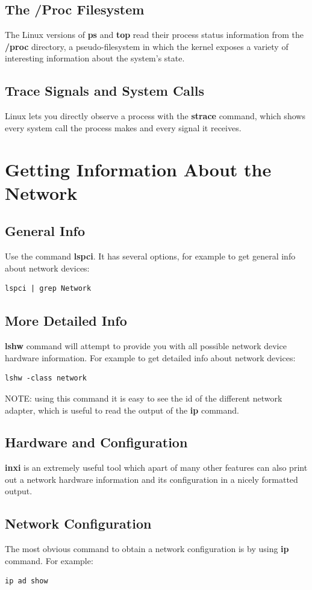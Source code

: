 \documentclass[10pt,letterpaper]{book}
\begin{document}
\subsection{The /Proc Filesystem}
The Linux versions of \textbf{ps} and \textbf{top} read their process status information from the \textbf{/proc} directory, a pseudo-filesystem in which the kernel exposes a variety of interesting information about the system's state.
\subsection{Trace Signals and System Calls}
Linux lets you directly observe a process with the \textbf{strace} command, which shows every system call the process makes and every signal it receives.

\section{Getting Information About the Network}
\subsection{General Info}
Use the command \textbf{lspci}. It has several options, for example to get general info about network devices:
\begin{lstlisting}
lspci | grep Network
\end{lstlisting}
\subsection{More Detailed Info}
\textbf{lshw} command will attempt to provide you with all possible network device hardware information. For example to get detailed info about network devices:
\begin{lstlisting}
lshw -class network
\end{lstlisting}
NOTE: using this command it is easy to see the id of the different network adapter, which is useful to read the output of the \textbf{ip} command.
\subsection{Hardware and Configuration}
\textbf{inxi} is an extremely useful tool which apart of many other features can also print out a network hardware information and its configuration in a nicely formatted output.
\subsection{Network Configuration}
The most obvious command to obtain a network configuration is by using \textbf{ip} command. For example:
\begin{lstlisting}
ip ad show
\end{lstlisting}
\end{document}
